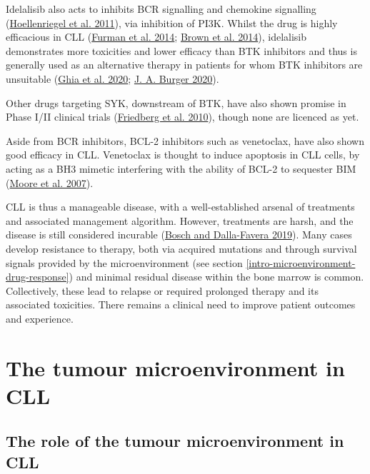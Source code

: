 \documentclass[11pt, a4paper, twosided]{book}
\begin{document}
Idelalisib also acts to inhibits BCR signalling and chemokine signalling (\protect\hyperlink{ref-Hoellenriegel2011}{Hoellenriegel et al. 2011}), via inhibition of PI3K. Whilst the drug is highly efficacious in CLL (\protect\hyperlink{ref-Furman2014}{Furman et al. 2014}; \protect\hyperlink{ref-Brown2014}{Brown et al. 2014}), idelalisib demonstrates more toxicities and lower efficacy than BTK inhibitors and thus is generally used as an alternative therapy in patients for whom BTK inhibitors are unsuitable (\protect\hyperlink{ref-Ghia2020}{Ghia et al. 2020}; \protect\hyperlink{ref-Burger2020}{J. A. Burger 2020}).

Other drugs targeting SYK, downstream of BTK, have also shown promise in Phase I/II clinical trials (\protect\hyperlink{ref-Friedberg2010}{Friedberg et al. 2010}), though none are licenced as yet.

Aside from BCR inhibitors, BCL-2 inhibitors such as venetoclax, have also shown good efficacy in CLL. Venetoclax is thought to induce apoptosis in CLL cells, by acting as a BH3 mimetic interfering with the ability of BCL-2 to sequester BIM (\protect\hyperlink{ref-Moore2007}{Moore et al. 2007}).

CLL is thus a manageable disease, with a well-established arsenal of treatments and associated management algorithm. However, treatments are harsh, and the disease is still considered incurable (\protect\hyperlink{ref-Bosch2019}{Bosch and Dalla-Favera 2019}). Many cases develop resistance to therapy, both via acquired mutations and through survival signals provided by the microenvironment (see section \ref{intro-microenvironment-drug-response}) and minimal residual disease within the bone marrow is common. Collectively, these lead to relapse or required prolonged therapy and its associated toxicities. There remains a clinical need to improve patient outcomes and experience.

\hypertarget{intro-tumour-microenvironment}{%
\section{The tumour microenvironment in CLL}\label{intro-tumour-microenvironment}}

\hypertarget{intro-tumour-microenvironment-role}{%
\subsection{The role of the tumour microenvironment in CLL}\label{intro-tumour-microenvironment-role}}
\end{document}
